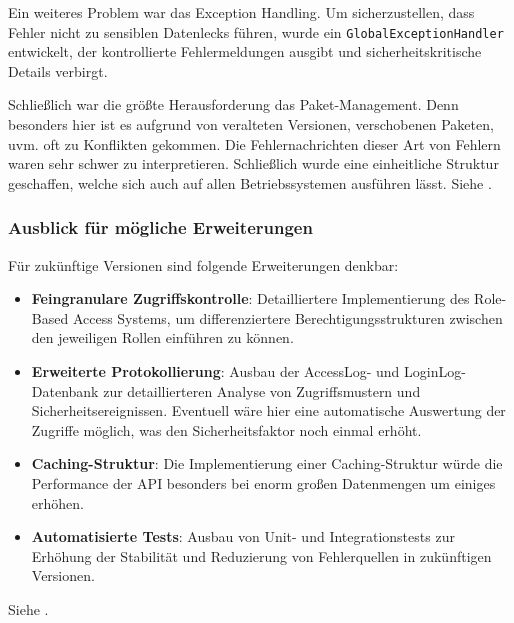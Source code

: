 				Ein weiteres Problem war das Exception Handling. Um sicherzustellen, dass Fehler nicht zu sensiblen Datenlecks führen, wurde ein \texttt{GlobalExceptionHandler} entwickelt, der kontrollierte Fehlermeldungen ausgibt und sicherheitskritische Details verbirgt.
				
				Schließlich war die größte Herausforderung das Paket-Management. Denn besonders hier ist es aufgrund von veralteten Versionen, verschobenen Paketen, uvm. oft zu Konflikten gekommen. Die Fehlernachrichten dieser Art von Fehlern waren sehr schwer zu interpretieren. Schließlich wurde eine einheitliche Struktur geschaffen, welche sich auch auf allen Betriebssystemen ausführen lässt. Siehe \cite{prompt-gpt-reflexion-implementation}.
				
				\subsubsection{Ausblick für mögliche Erweiterungen}
				
				Für zukünftige Versionen sind folgende Erweiterungen denkbar:
				
				\begin{itemize}
					\item \textbf{Feingranulare Zugriffskontrolle}: Detailliertere Implementierung des Role-Based Access Systems, um differenziertere Berechtigungsstrukturen zwischen den jeweiligen Rollen einführen zu können.
					\item \textbf{Erweiterte Protokollierung}: Ausbau der AccessLog- und LoginLog-Datenbank zur detaillierteren Analyse von Zugriffsmustern und Sicherheitsereignissen. Eventuell wäre hier eine automatische Auswertung der Zugriffe möglich, was den Sicherheitsfaktor noch einmal erhöht.
					\item \textbf{Caching-Struktur}: Die Implementierung einer Caching-Struktur würde die Performance der API besonders bei enorm großen Datenmengen um einiges erhöhen. 
					\item \textbf{Automatisierte Tests}: Ausbau von Unit- und Integrationstests zur Erhöhung der Stabilität und Reduzierung von Fehlerquellen in zukünftigen Versionen.
				\end{itemize} Siehe \cite{prompt-gpt-reflexion-implementation}.
